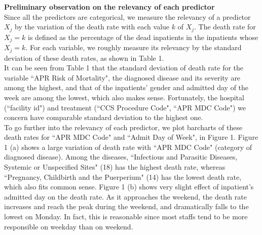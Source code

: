 \documentclass[a4paper]{article}
\begin{document}
\noindent
\textbf{\large Preliminary observation on the relevancy of each predictor\\}
\indent
Since all the predictors are categorical, we measure the relevancy of a predictor $X_j$ by the variation of the death rate with each value $k$ of $X_j$. The death rate for $X_j=k$ is defined as the percentage of the dead inpatients in the inpatients whose $X_j=k$. For each variable, we roughly measure its relevancy by the standard deviation of these death rates, as shown in Table 1.\\
\indent
It can be seen from Table 1 that the standard deviation of death rate for the variable ``APR Risk of Mortality", the diagnosed disease and its severity are among the highest, and that of the inpatients' gender and admitted day of the week are among the lowest, which also makes sense. Fortunately, the hospital (``facility id") and treatment (``CCS Procedure Code", ``APR MDC Code") we concern have comparable standard deviation to the highest one.\\
\indent
To go further into the relevancy of each predictor, we plot barcharts of these death rates for ``APR MDC Code" and ``Admit Day of Week", in Figure 1. Figure 1 (a) shows a large variation of death rate with ``APR MDC Code" (category of diagnosed disease). Among the diseases, ``Infectious and Parasitic Diseases, Systemic or Unspecified Sites" (18) has the highest death rate, whereas ``Pregnancy, Childbirth and the Puerperium" (14) has the lowest death rate, which also fits common sense. Figure 1 (b) shows very slight effect of inpatient's admitted day on the death rate. As it approaches the weekend, the death rate increases and reach the peak during the weekend, and dramatically falls to the lowest on Monday. In fact, this is reasonable since most staffs tend to be more responsible on weekday than on weekend.\\ 
\end{document}
